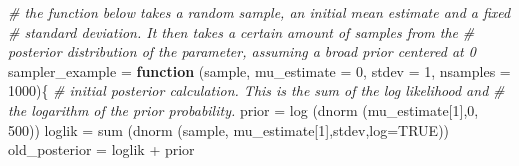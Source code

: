 \documentclass[
]{book}
\newenvironment{Shaded}{\begin{snugshade}}{\end{snugshade}}
\newcommand{\AttributeTok}[1]{\textcolor[rgb]{0.77,0.63,0.00}{#1}}
\newcommand{\CommentTok}[1]{\textcolor[rgb]{0.56,0.35,0.01}{\textit{#1}}}
\newcommand{\ConstantTok}[1]{\textcolor[rgb]{0.00,0.00,0.00}{#1}}
\newcommand{\ControlFlowTok}[1]{\textcolor[rgb]{0.13,0.29,0.53}{\textbf{#1}}}
\newcommand{\DecValTok}[1]{\textcolor[rgb]{0.00,0.00,0.81}{#1}}
\newcommand{\FunctionTok}[1]{\textcolor[rgb]{0.00,0.00,0.00}{#1}}
\newcommand{\NormalTok}[1]{#1}
\newcommand{\OtherTok}[1]{\textcolor[rgb]{0.56,0.35,0.01}{#1}}
\newcommand{\SpecialCharTok}[1]{\textcolor[rgb]{0.00,0.00,0.00}{#1}}
\begin{document}
\begin{Shaded}
\begin{Highlighting}[]
\CommentTok{\# the function below takes a random sample, an initial mean estimate and a fixed}
\CommentTok{\# standard deviation. It then takes a certain amount of samples from the }
\CommentTok{\# posterior distribution of the parameter, assuming a broad prior centered at 0}
\NormalTok{sampler\_example }\OtherTok{=} \ControlFlowTok{function}\NormalTok{ (sample, }\AttributeTok{mu\_estimate =} \DecValTok{0}\NormalTok{, }\AttributeTok{stdev =} \DecValTok{1}\NormalTok{, }\AttributeTok{nsamples =} \DecValTok{1000}\NormalTok{)\{}
  \CommentTok{\# initial posterior calculation. This is the sum of the log likelihood and}
  \CommentTok{\# the logarithm of the prior probability.}
\NormalTok{  prior }\OtherTok{=} \FunctionTok{log}\NormalTok{ (}\FunctionTok{dnorm}\NormalTok{ (mu\_estimate[}\DecValTok{1}\NormalTok{],}\DecValTok{0}\NormalTok{, }\DecValTok{500}\NormalTok{))}
\NormalTok{  loglik }\OtherTok{=} \FunctionTok{sum}\NormalTok{ (}\FunctionTok{dnorm}\NormalTok{ (sample, mu\_estimate[}\DecValTok{1}\NormalTok{],stdev,}\AttributeTok{log=}\ConstantTok{TRUE}\NormalTok{))}
\NormalTok{  old\_posterior }\OtherTok{=}\NormalTok{ loglik }\SpecialCharTok{+}\NormalTok{ prior}
  

\end{Highlighting}
\end{Shaded}
\end{document}
